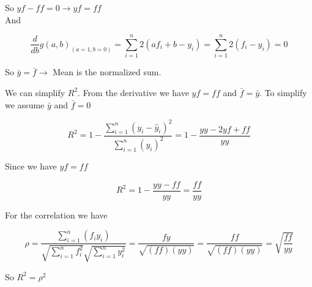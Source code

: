 So $yf - ff = 0 \rightarrow yf = ff $ \\


And

\[ \frac{d}{db}g(a,b)_{(a = 1, b = 0)} = \sum\limits_{i=1}^n 2(af_i + b - y_i) = \sum\limits_{i=1}^n 2(f_i - y_i) = 0  \]

So $\bar{y} = \bar{f} \rightarrow$ Mean is the normalized sum.


We can simplify $R^2$. From the derivative we have $yf = ff$ and $\bar{f} = \bar{y}$. To simplify we assume $\bar{y}$ and $\bar{f} = 0 $

\[ R^2 = 1 - \frac{\sum\limits_{i=1}^n (y_i - \hat{y}_i)^2}{\sum\limits_{i=1}^n (y_i)^2} = 1 - \frac{yy - 2yf + ff}{yy} \]

Since we have $yf = ff$

\[ R^2 = 1 - \frac{yy - ff}{yy}  = \frac{ff}{yy}\]

For the correlation we have 

\[ \rho =  \frac{\sum\limits_{i=1}^n(f_i y_i)}{\sqrt{\sum\limits_{i=1}^n f_i ^2}\sqrt{\sum\limits_{i=1}^n y_i^2}}  = \frac{fy}{\sqrt{(ff)(yy)}} = \frac{ff}{\sqrt{(ff)(yy)}} = \sqrt{\frac{ff}{yy}}\]


So $R^2 = \rho^2$













